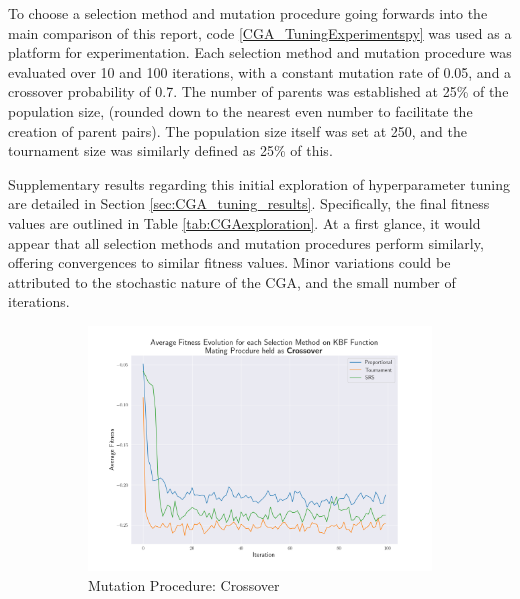 \documentclass[10pt]{article}
\begin{document}
\begin{multicols}{2}
To choose a selection method and mutation procedure going forwards into the main comparison of this report, code \ref{CGA_TuningExperimentspy} was used as a platform for experimentation. Each selection method and mutation procedure was evaluated over 10 and 100 iterations, with a constant mutation rate of 0.05, and a crossover probability of 0.7. The number of parents was established at 25\% of the population size, (rounded down to the nearest even number to facilitate the creation of parent pairs). The population size itself was set at 250, and the tournament size was similarly defined as 25\% of this.

Supplementary results regarding this initial exploration of hyperparameter tuning are detailed in Section \ref{sec:CGA_tuning_results}. Specifically, the final fitness values are outlined in Table \ref{tab:CGAexploration}. At a first glance, it would appear that all selection methods and mutation procedures perform similarly, offering convergences to similar fitness values. Minor variations could be attributed to the stochastic nature of the CGA, and the small number of iterations.
\vspace{-1mm}
\begin{figure}[H]
    \centering
    \begin{subfigure}{0.46\textwidth}
        \includegraphics[width=\textwidth]{../figures/Permanent Images/Fitness_Evolution_Crossover.png}
        \caption{Mutation Procedure: Crossover}
        \label{fig:CGA_fitness_evo_Crossover}
    \end{subfigure}
    \begin{subfigure}{0.46\textwidth}

\end{subfigure}
\end{figure}
\end{multicols}
\end{document}
